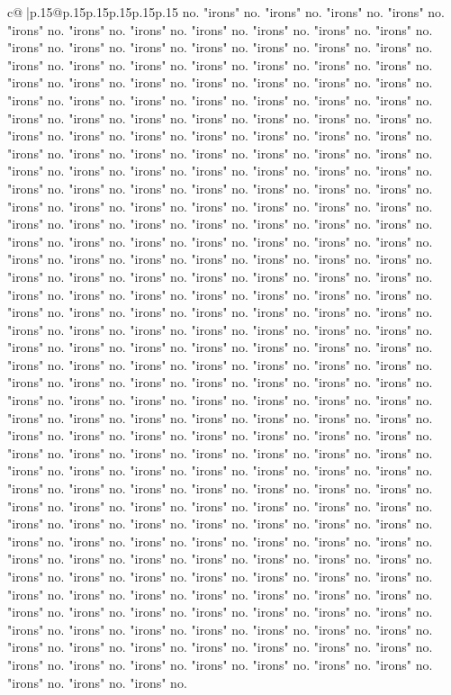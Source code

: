 \documentclass{article}
\begin{document}
{\begin{supertabular}{c@{$\;$}|p{.15\linewidth}@{}p{.15\linewidth}p{.15\linewidth}p{.15\linewidth}p{.15\linewidth}p{.15\linewidth}}
{{{no. "irons" no. "irons" no. "irons" no. "irons" no. "irons" no. "irons" no. "irons" no. "irons" no. "irons" no. "irons" no. "irons" no. "irons" no. "irons" no. "irons" no. "irons" no. "irons" no. "irons" no. "irons" no. "irons" no. "irons" no. "irons" no. "irons" no. "irons" no. "irons" no. "irons" no. "irons" no. "irons" no. "irons" no. "irons" no. "irons" no. "irons" no. "irons" no. "irons" no. "irons" no. "irons" no. "irons" no. "irons" no. "irons" no. "irons" no. "irons" no. "irons" no. "irons" no. "irons" no. "irons" no. "irons" no. "irons" no. "irons" no. "irons" no. "irons" no. "irons" no. "irons" no. "irons" no. "irons" no. "irons" no. "irons" no. "irons" no. "irons" no. "irons" no. "irons" no. "irons" no. "irons" no. "irons" no. "irons" no. "irons" no. "irons" no. "irons" no. "irons" no. "irons" no. "irons" no. "irons" no. "irons" no. "irons" no. "irons" no. "irons" no. "irons" no. "irons" no. "irons" no. "irons" no. "irons" no. "irons" no. "irons" no. "irons" no. "irons" no. "irons" no. "irons" no. "irons" no. "irons" no. "irons" no. "irons" no. "irons" no. "irons" no. "irons" no. "irons" no. "irons" no. "irons" no. "irons" no. "irons" no. "irons" no. "irons" no. "irons" no. "irons" no. "irons" no. "irons" no. "irons" no. "irons" no. "irons" no. "irons" no. "irons" no. "irons" no. "irons" no. "irons" no. "irons" no. "irons" no. "irons" no. "irons" no. "irons" no. "irons" no. "irons" no. "irons" no. "irons" no. "irons" no. "irons" no. "irons" no. "irons" no. "irons" no. "irons" no. "irons" no. "irons" no. "irons" no. "irons" no. "irons" no. "irons" no. "irons" no. "irons" no. "irons" no. "irons" no. "irons" no. "irons" no. "irons" no. "irons" no. "irons" no. "irons" no. "irons" no. "irons" no. "irons" no. "irons" no. "irons" no. "irons" no. "irons" no. "irons" no. "irons" no. "irons" no. "irons" no. "irons" no. "irons" no. "irons" no. "irons" no. "irons" no. "irons" no. "irons" no. "irons" no. "irons" no. "irons" no. "irons" no. "irons" no. "irons" no. "irons" no. "irons" no. "irons" no. "irons" no. "irons" no. "irons" no. "irons" no. "irons" no. "irons" no. "irons" no. "irons" no. "irons" no. "irons" no. "irons" no. "irons" no. "irons" no. "irons" no. "irons" no. "irons" no. "irons" no. "irons" no. "irons" no. "irons" no. "irons" no. "irons" no. "irons" no. "irons" no. "irons" no. "irons" no. "irons" no. "irons" no. "irons" no. "irons" no. "irons" no. "irons" no. "irons" no. "irons" no. "irons" no. "irons" no. "irons" no. "irons" no. "irons" no. "irons" no. "irons" no. "irons" no. "irons" no. "irons" no. "irons" no. "irons" no. "irons" no. "irons" no. "irons" no. "irons" no. "irons" no. "irons" no. "irons" no. "irons" no. "irons" no. "irons" no. "irons" no. "irons" no. "irons" no. "irons" no. "irons" no. "irons" no. "irons" no. "irons" no. "irons" no. "irons" no. "irons" no. "irons" no. "irons" no. "irons" no. "irons" no. "irons" no. "irons" no. "irons" no. "irons" no. "irons" no. "irons" no. "irons" no. "irons" no. "irons" no. "irons" no. "irons" no. "irons" no. "irons" no. "irons" no. "irons" no. "irons" no. "irons" no. "irons" no. "irons" no. "irons" no. "irons" no. "irons" no. "irons" no. "irons" no. "irons" no. "irons" no. }}}
\end{supertabular}}
\end{document}
